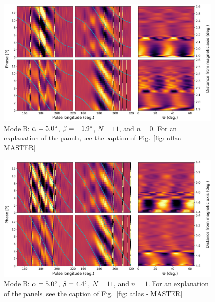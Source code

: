 \begin{figure}
	\begin{center}
		\includegraphics[width=\atlasHeightFrac\textwidth]{Figures/B0031/atlas/B_517005011000_plots}
		\caption[Atlas results: Mode B -- $\alpha=5.0\degr$, $\beta=-1.9\degr$, $N=11$, $n=0$]{Mode B: $\alpha=5.0\degr$, $\beta=-1.9\degr$, $N=11$, and $n=0$. For an explanation of the panels, see the caption of Fig.~\ref{fig: atlas - MASTER} }
		\label{fig: atlas - B_517005011000}
	\end{center}
\end{figure}

\begin{figure}
	\begin{center}
		\includegraphics[width=\atlasHeightFrac\textwidth]{Figures/B0031/atlas/B_517005011001_plots}
		\caption[Atlas results: Mode B -- $\alpha=5.0\degr$, $\beta=4.4\degr$, $N=11$, $n=1$]{Mode B: $\alpha=5.0\degr$, $\beta=4.4\degr$, $N=11$, and $n=1$. For an explanation of the panels, see the caption of Fig.~\ref{fig: atlas - MASTER} }
		\label{fig: atlas - B_517005011001}
	\end{center}
\end{figure}

